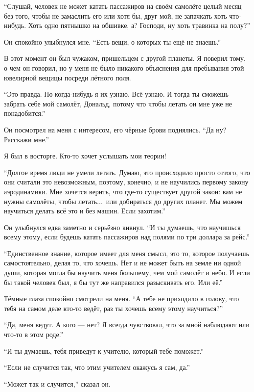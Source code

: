 ``Слушай, человек не может катать пассажиров на своём самолёте целый месяц без того, чтобы не замаслить
 его или хотя бы, друг мой, не запачкать хоть что-нибудь. Хоть одно пятнышко на обшивке, а? Господи, ну
 хоть травинка на полу?''

Он спокойно улыбнулся мне. ``Есть вещи, о которых ты ещё не знаешь.''

В этот момент он был чужаком, пришельцем с другой планеты. Я поверил тому, о чем он говорил, но у меня не было никакого объяснения для пребывания этой ювелирной вещицы посреди лётного поля.

``Это правда. Но когда-нибудь я их узнаю. Всё узнаю. И тогда ты сможешь забрать себе мой самолёт,
 Дональд, потому что чтобы летать он мне уже не понадобится.''

Он посмотрел на меня с интересом, его чёрные брови поднялись.
``Да ну? Расскажи мне.''

Я был в восторге. Кто-то хочет услышать мои теории!

``Долгое время люди не умели летать. Думаю, это происходило просто оттого, что они считали это
невозможным, поэтому, конечно, и не научились первому закону аэродинамики. Мне хочется верить,
что где-то существует другой закон: вам не нужны самолёты, чтобы летать...\ или добираться до
других планет. Мы можем научиться делать всё это и без машин. Если захотим.''

Он улыбнулся едва заметно и серьёзно кивнул.
``И ты думаешь, что научишься всему этому, если будешь катать пассажиров над полями по три доллара за
 рейс.''

``Единственное знание, которое имеет для меня смысл, это то, которое получаешь самостоятельно,
делая то, что хочешь. Нет и не может быть на земле ни одной души, которая могла бы научить меня
большему, чем мой самолёт и небо. И если бы такой человек был, я бы тут же направился разыскивать
его. Или её.''

Тёмные глаза спокойно смотрели на меня.
``А тебе не приходило в голову, что тебя на самом деле кто-то ведёт, раз ты хочешь всему этому
 научиться?''

``Да, меня ведут. А кого --- нет? Я всегда чувствовал, что за мной наблюдают или что-то в этом роде.''

``И ты думаешь, тебя приведут к учителю, который тебе поможет.''

``Если не случится так, что этим учителем окажусь я сам, да.''

``Может так и случится,'' сказал он.

